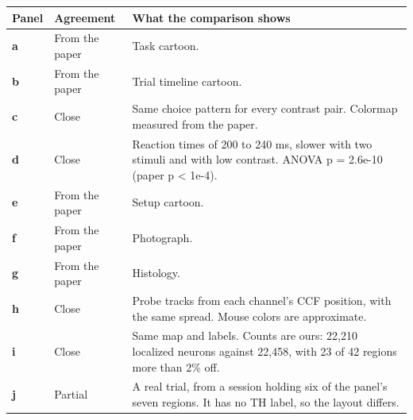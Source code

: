 \begin{longtable}{@{}p{1.1cm}p{2.5cm}p{11.8cm}@{}}
\toprule
Panel & Agreement & What the comparison shows \\
\midrule
\endhead
\textbf{a} & From the paper & Task cartoon. \\
\textbf{b} & From the paper & Trial timeline cartoon. \\
\textbf{c} & Close & Same choice pattern for every contrast pair. Colormap measured from the paper. \\
\textbf{d} & Close & Reaction times of 200 to 240 ms, slower with two stimuli and with low contrast. ANOVA p = 2.6e-10 (paper p < 1e-4). \\
\textbf{e} & From the paper & Setup cartoon. \\
\textbf{f} & From the paper & Photograph. \\
\textbf{g} & From the paper & Histology. \\
\textbf{h} & Close & Probe tracks from each channel's CCF position, with the same spread. Mouse colors are approximate. \\
\textbf{i} & Close & Same map and labels. Counts are ours: 22,210 localized neurons against 22,458, with 23 of 42 regions more than 2\% off. \\
\textbf{j} & Partial & A real trial, from a session holding six of the panel's seven regions. It has no TH label, so the layout differs. \\
\bottomrule
\end{longtable}
